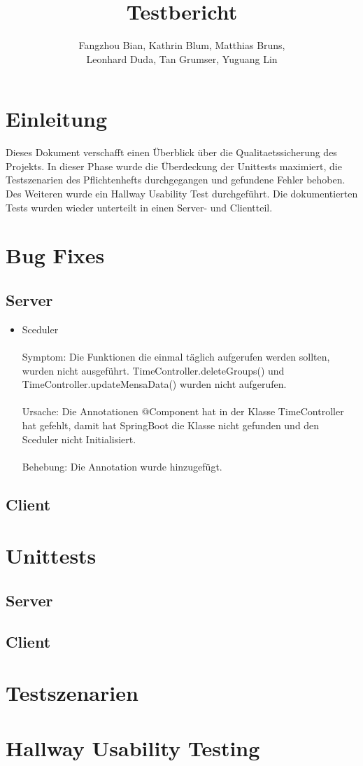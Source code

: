 \documentclass[a4paper]{scrreprt}
\begin{document}
\title{Testbericht}
\author{Fangzhou Bian, Kathrin Blum, Matthias Bruns, \\Leonhard Duda, Tan Grumser, Yuguang Lin}
\maketitle
\tableofcontents



\chapter{Einleitung}

Dieses Dokument verschafft einen Überblick über die \Gls{Qualitaetssicherung} des Projekts. In dieser Phase wurde die Überdeckung der \Gls{Unittest}s maximiert, die Testszenarien des Pflichtenhefts durchgegangen und gefundene Fehler behoben. Des Weiteren wurde ein \Gls{Hallway Usability Test} durchgeführt. Die dokumentierten Tests wurden wieder unterteilt in einen Server- und Clientteil.

\chapter{Bug Fixes}
\section{Server}

\begin{itemize}
\item Sceduler\\ \\
Symptom: Die Funktionen die einmal täglich aufgerufen werden sollten, wurden nicht ausgeführt. TimeController.deleteGroups() und TimeController.updateMensaData() wurden nicht aufgerufen.\\ \\
Ursache: Die Annotationen @Component hat in der Klasse TimeController hat gefehlt, damit hat SpringBoot die Klasse nicht gefunden und den Sceduler nicht Initialisiert.\\ \\
Behebung:  Die Annotation wurde hinzugefügt.
\end{itemize}

\section{Client}

\chapter{Unittests}
\section{Server}
\section{Client}

\chapter{Testszenarien}

\chapter{Hallway Usability Testing}

\printglossaries
\end{document}
